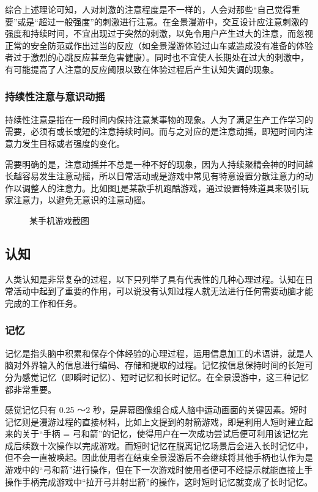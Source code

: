 综合上述理论可知，人对刺激的注意程度是不一样的，人会对那些“自己觉得重要”或是“超过一般强度”的刺激进行注意。在全景漫游中，交互设计应注意刺激的强度和持续时间，不宜出现过于突然的刺激，以免令用户产生过大的注意，而忽视正常的安全防范或作出过当的反应（如全景漫游体验过山车或造成没有准备的体验者过于激烈的心跳反应甚至危害健康）。同时也不宜使人长期处在过大的刺激中，有可能提高了人注意的反应阈限以致在体验过程后产生认知失调的现象。

\subsubsection{持续性注意与意识动摇}
持续性注意是指在一段时间内保持注意某事物的现象。人为了满足生产工作学习的需要，必须有或长或短的注意持续时间。而与之对应的是注意动摇，即短时间内注意力发生目标或者强度的变化。

需要明确的是，注意动摇并不总是一种不好的现象，因为人持续聚精会神的时间越长越容易发生注意动摇，所以日常活动或是游戏中常见有特意设置分散注意力的动作以调整人的注意力。比如图\ref{fig:magnet}是某款手机跑酷游戏，通过设置特殊道具来吸引玩家注意力，以避免无意识的注意动摇。

\begin{figure}[htp]
\centering
{}
\caption{某手机游戏截图}
\label{fig:magnet}
\end{figure}

\subsection{认知}
人类认知是非常复杂的过程，以下只列举了具有代表性的几种心理过程。认知在日常活动中起到了重要的作用，可以说没有认知过程人就无法进行任何需要动脑才能完成的工作和任务。

\subsubsection{记忆}
记忆是指头脑中积累和保存个体经验的心理过程，运用信息加工的术语讲，就是人脑对外界输入的信息进行编码、存储和提取的过程。记忆按信息保持时间的长短可分为感觉记忆（即瞬时记忆）、短时记忆和长时记忆。在全景漫游中，这三种记忆都非常重要。

感觉记忆只有 0.25
～2 秒，是屏幕图像组合成人脑中运动画面的关键因素。短时记忆则是漫游过程的直接材料，比如上文提到的射箭游戏，即是利用人短时建立起来的关于“手柄 = 弓和箭”的记忆，使得用户在一次成功尝试后便可利用该记忆完成后续数十次操作以完成游戏。而短时记忆在脱离记忆场景后会进入长时记忆中，但不会一直被唤起。因此使用者在结束全景漫游后不会继续将其他手柄也认作为是游戏中的“弓和箭”进行操作，但在下一次游戏时使用者便可不经提示就能直接上手操作手柄完成游戏中“拉开弓并射出箭”的操作，这时短时记忆就变成了长时记忆。

